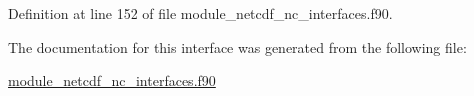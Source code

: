Definition at line 152 of file module\+\_\+netcdf\+\_\+nc\+\_\+interfaces.\+f90.



The documentation for this interface was generated from the following file\+:\begin{DoxyCompactItemize}
\item 
\hyperlink{module__netcdf__nc__interfaces_8f90}{module\+\_\+netcdf\+\_\+nc\+\_\+interfaces.\+f90}\end{DoxyCompactItemize}
